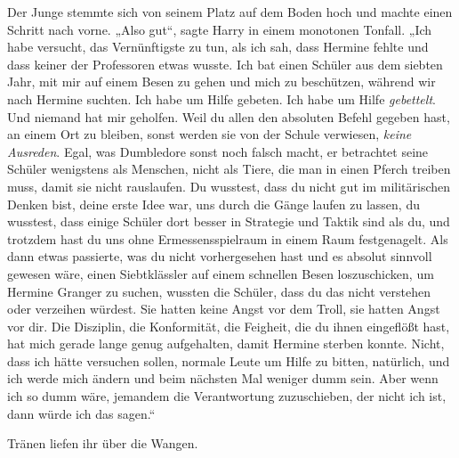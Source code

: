 Der Junge stemmte sich von seinem Platz auf dem Boden hoch und machte einen Schritt nach vorne. „Also gut“, sagte Harry in einem monotonen Tonfall. „Ich habe versucht, das Vernünftigste zu tun, als ich sah, dass Hermine fehlte und dass keiner der Professoren etwas wusste. Ich bat einen Schüler aus dem siebten Jahr, mit mir auf einem Besen zu gehen und mich zu beschützen, während wir nach Hermine suchten. Ich habe um Hilfe gebeten. Ich habe um Hilfe \emph{gebettelt}. Und niemand hat mir geholfen. Weil du allen den absoluten Befehl gegeben hast, an einem Ort zu bleiben, sonst werden sie von der Schule verwiesen, \emph{keine Ausreden}. Egal, was Dumbledore sonst noch falsch macht, er betrachtet seine Schüler wenigstens als Menschen, nicht als Tiere, die man in einen Pferch treiben muss, damit sie nicht rauslaufen. Du wusstest, dass du nicht gut im militärischen Denken bist, deine erste Idee war, uns durch die Gänge laufen zu lassen, du wusstest, dass einige Schüler dort besser in Strategie und Taktik sind als du, und trotzdem hast du uns ohne Ermessensspielraum in einem Raum festgenagelt. Als dann etwas passierte, was du nicht vorhergesehen hast und es absolut sinnvoll gewesen wäre, einen Siebtklässler auf einem schnellen Besen loszuschicken, um Hermine Granger zu suchen, wussten die Schüler, dass du das nicht verstehen oder verzeihen würdest. Sie hatten keine Angst vor dem Troll, sie hatten Angst vor dir. Die Disziplin, die Konformität, die Feigheit, die du ihnen eingeflößt hast, hat mich gerade lange genug aufgehalten, damit Hermine sterben konnte. Nicht, dass ich hätte versuchen sollen, normale Leute um Hilfe zu bitten, natürlich, und ich werde mich ändern und beim nächsten Mal weniger dumm sein. Aber wenn ich so dumm wäre, jemandem die Verantwortung zuzuschieben, der nicht ich ist, dann würde ich das sagen.“

Tränen liefen ihr über die Wangen.

